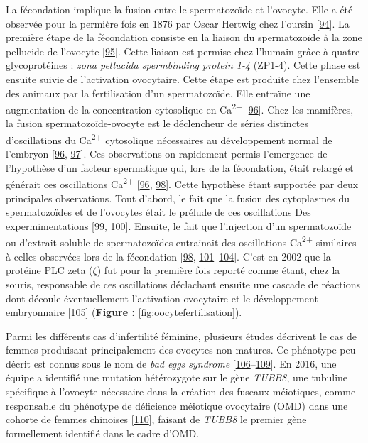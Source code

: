 \documentclass[12pt,a4paper,twoside]{ugathesis}
\theoremstyle{definition}
\theoremstyle{definition}
\theoremstyle{definition}
\theoremstyle{remark}
\begin{document}
La fécondation implique la fusion entre le spermatozoïde et l'ovocyte.
Elle a été observée pour la permière fois en 1876 par Oscar Hertwig chez
l'oursin {[}\protect\hyperlink{ref-hertwig1875beitrage}{94}{]}. La
première étape de la fécondation consiste en la liaison du spermatozoïde
à la zone pellucide de l'ovocyte
{[}\protect\hyperlink{ref-Wassarman2008}{95}{]}. Cette liaison est
permise chez l'humain grâce à quatre glycoprotéines : \emph{zona
pellucida spermbinding protein 1-4} (ZP1-4). Cette phase est ensuite
suivie de l'activation ovocytaire. Cette étape est produite chez
l'ensemble des animaux par la fertilisation d'un spermatozoïde. Elle
entraïne une augmentation de la concentration cytosolique en
Ca\textsuperscript{2+} {[}\protect\hyperlink{ref-Stricker}{96}{]}. Chez
les mamifères, la fusion spermatozoïde-ovocyte est le déclencheur de
séries distinctes d'oscillations du Ca\textsuperscript{2+} cytosolique
nécessaires au développement normal de l'embryon
{[}\protect\hyperlink{ref-Stricker}{96},
\protect\hyperlink{ref-Miyazaki1993}{97}{]}. Ces observations on
rapidement permis l'emergence de l'hypothèse d'un facteur spermatique
qui, lors de la fécondation, était relargé et générait ces oscillations
Ca\textsuperscript{2+} {[}\protect\hyperlink{ref-Stricker}{96},
\protect\hyperlink{ref-Swann1990}{98}{]}. Cette hypothèse étant
supportée par deux principales observations. Tout d'abord, le fait que
la fusion des cytoplasmes du spermatozoïdes et de l'ovocytes était le
prélude de ces oscillations Des expermimentations
{[}\protect\hyperlink{ref-Sun1992}{99},
\protect\hyperlink{ref-Lawrence1997}{100}{]}. Ensuite, le fait que
l'injection d'un spermatozoïde ou d'extrait soluble de spermatozoïdes
entrainait des oscillations Ca\textsuperscript{2+} similaires à celles
observées lors de la fécondation
{[}\protect\hyperlink{ref-Swann1990}{98},
\protect\hyperlink{ref-Wu1997}{101}--\protect\hyperlink{ref-Tang2000}{104}{]}.
C'est en 2002 que la protéine PLC zeta (\(\zeta\)) fut pour la première
fois reporté comme étant, chez la souris, responsable de ces
oscillations déclachant ensuite une cascade de réactions dont découle
éventuellement l'activation ovocytaire et le développement embryonnaire
{[}\protect\hyperlink{ref-Saunders2002}{105}{]} (\textbf{Figure :}
\ref{fig:oocytefertilisation}).

Parmi les différents cas d'infertilité féminine, plusieurs études
décrivent le cas de femmes produisant principalement des ovocytes non
matures. Ce phénotype peu décrit est connus sous le nom de \emph{bad
eggs syndrome}
{[}\protect\hyperlink{ref-Hartshorne1999}{106}--\protect\hyperlink{ref-Hourvitz2010}{109}{]}.
En 2016, une équipe a identifié une mutation hétérozygote sur le gène
\emph{TUBB8}, une tubuline spécifique à l'ovocyte nécessaire dans la
création des fuseaux méiotiques, comme responsable du phénotype de
déficience méiotique ovocytaire (OMD) dans une cohorte de femmes
chinoises {[}\protect\hyperlink{ref-Feng2016}{110}{]}, faisant de
\emph{TUBB8} le premier gène formellement identifié dans le cadre d'OMD.
\end{document}
